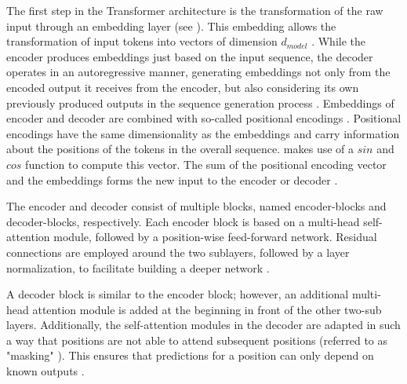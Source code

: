 The first step in the Transformer architecture is the transformation of the raw input through an embedding layer (see ).
This embedding allows the transformation of input tokens into vectors of dimension $d_{model}$ \cite{vaswani2017AttentionAllYou}.
While the encoder produces embeddings just based on the input sequence, the decoder operates in an autoregressive manner, generating embeddings not only from the encoded output it receives from the encoder, but also considering its own previously produced outputs in the sequence generation process \cite{vaswani2017AttentionAllYou}.
Embeddings of encoder and decoder are combined with so-called positional encodings \cite{vaswani2017AttentionAllYou, lin2022SurveyTransformers}.
Positional encodings have the same dimensionality as the embeddings and carry information about the positions of the tokens in the overall sequence.
\textcite{vaswani2017AttentionAllYou} makes use of a $sin$ and $cos$ function to compute this vector.
The sum of the positional encoding vector and the embeddings forms the new input to the encoder or decoder \cite{vaswani2017AttentionAllYou}.

The encoder and decoder consist of multiple blocks, named encoder-blocks and decoder-blocks, respectively.
Each encoder block is based on a multi-head self-attention module, followed by a position-wise feed-forward network.
Residual connections are employed around the two sublayers, followed by a layer normalization, to facilitate building a deeper network \cite{vaswani2017AttentionAllYou, lin2022SurveyTransformers}.

A decoder block is similar to the encoder block; however, an additional multi-head attention module is added at the beginning in front of the other two-sub layers.
Additionally, the self-attention modules in the decoder are adapted in such a way that positions are not able to attend subsequent positions (referred to as "masking" \cite[p. 3]{vaswani2017AttentionAllYou}).
This ensures that predictions for a position can only depend on known outputs \cite{vaswani2017AttentionAllYou, lin2022SurveyTransformers}.

